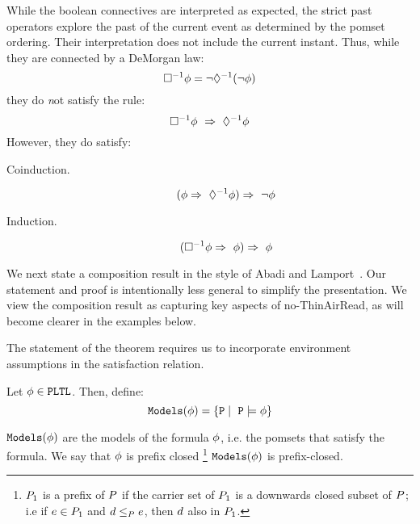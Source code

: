 While the boolean connectives are interpreted as expected, the strict past operators explore the past of the current event as determined by the pomset ordering.  Their interpretation does not include the current instant.  Thus, while they are connected by a DeMorgan law:
\[ \Box^{-1}\phi = \neg\Diamond^{-1}(\neg\phi) \]
they do {\emph not} satisfy the rule:
\[ \Box^{-1}\phi\ \Rightarrow\ \Diamond^{-1}\phi \]
However, they do satisfy:
\begin{description}
\item[Coinduction. ]
\[ (\phi \Rightarrow\ \Diamond^{-1}{\phi}) \Rightarrow\ \neg \phi \]
\item[Induction.] 
\[ (\Box^{-1}\phi \Rightarrow\ \phi) \Rightarrow\ \phi \]
\end{description}

We next state a composition result in the style of Abadi and Lamport~\cite{Abadi:1993:CS:151646.151649}.  Our statement and proof is intentionally less general to simplify the presentation.  We view the composition result as capturing key aspects of no-ThinAirRead, as will become clearer in the examples below.

The statement of the theorem requires us to incorporate environment assumptions in the satisfaction relation.  
\begin{definition}
Let $\phi \in {\tt PLTL}$.  Then, define:
\[ \tt Models{(\phi)} = \{ P \mid \ P \models \phi \} \]
\end{definition}
$ \tt Models{(\phi)}$ are the models of the formula $\phi$, i.e. the pomsets that satisfy the formula.    We say that $\phi$ is prefix closed \footnote{$P_1$ is a prefix of $P$ if the carrier set of $P_1$ is a downwards closed subset of $P$; i.e if  $e \in P_1$ and $ d \le_{P} e$, then $d$ also in $P_1$.} $ \tt Models{(\phi)}$ is prefix-closed.

